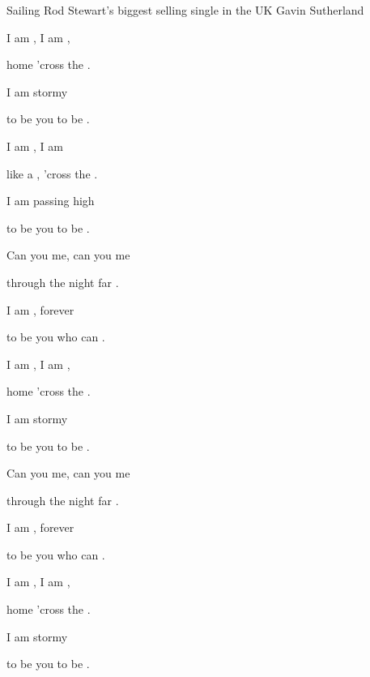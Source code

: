 \begin{SBSong}{Sailing}
  {Rod Stewart's biggest selling single in the UK}
  {Gavin Sutherland}
  \begin{SBVerse}
    I am , I am ,

    home  'cross the .

    I am  stormy 

    to be  you to be . 
  \end{SBVerse}
  \begin{SBVerse}
    I am , I am 

    like a , 'cross the .

    I am  passing high 

    to be  you to be . 
  \end{SBVerse}
  \begin{SBVerse}
    Can you  me, can you  me 

    through the  night far .

    I am , forever 

    to be  you who can . 
  \end{SBVerse}
  \begin{SBVerse}
    I am , I am ,

    home  'cross the .

    I am  stormy 

    to be  you to be . 
  \end{SBVerse}
  \begin{SBVerse}
    Can you  me, can you  me 

    through the  night far .

    I am , forever 

    to be  you who can . 
  \end{SBVerse}
  \begin{SBVerse}
    I am , I am ,

    home  'cross the .

    I am  stormy 

    to be  you to be . 
  \end{SBVerse}
\end{SBSong}